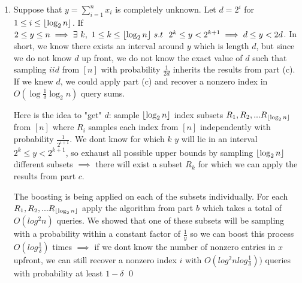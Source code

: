 \documentclass[12pt]{article}
\DeclarePairedDelimiter\floor{\lfloor}{\rfloor}
\begin{document}
\begin{solution}
\begin{enumerate}[label=(\alph*)]
\[
\implies \Pr{Q_i \neq 1} \leq 1 -\frac{1}{4d}
\]
The same analysis from the previous question now holds. We get a larger constant value on $d$ but it still requires $O(\log{\frac{1}{\delta}}\log_{2}{n})$ query sums to find a nonzero index with probability $\geq 1-\delta$. Qualitatively, if we can construct an estimate for $y$ within an interval $d \leq y \leq 2d$ we can find a non negative index in $x$ w.h.p \qed

\item Suppose that $y = \sum_{i=1}^n{x_i}$ is completely unknown. Let $d=2^i$ for $1 \leq i \leq \floor*{\log_{2}{n}}$. If $2 \leq y \leq n \implies \exists~k, ~1\leq k \leq \floor*{\log_{2}{n}} ~s.t~ ~ 2^k \leq y < 2^{k+1} \implies d \leq y < 2d$. In short, we know there exists an interval around $y$ which is length $d$, but since we do not know $d$ up front, we do not know the exact value of $d$ such that sampling $iid$ from $[n]$ with probability $\frac{1}{2d}$ inherits the results from part (c). If we knew $d$, we could apply part (c) and recover a nonzero index in $O(\log{\frac{1}{\delta}}\log_{2}{n})$ query sums.

Here is the idea to "get" $d$: sample  $\floor*{\log_{2}{n}}$ index subsets $R_1, R_2, ... R_{\floor*{\log_{2}{n}}}$ from $[n]$ where $R_i$ samples each index from $[n]$ independently with probability $\frac{1}{2^{i+1}}$. We dont know for which $k$ $y$ will lie in an interval $2^k \leq y < 2^{k+1}$, so exhaust all possible upper bounds by sampling $\floor*{\log_{2}{n}}$ different subsets $\implies $ there will exist a subset $R_k$ for which we can apply the results from part $c$. 

The boosting is being applied on each of the subsets individually. For each $R_1, R_2, ... R_{\floor*{\log_{2}{n}}}$ apply the algorithm from part $b$ which takes a total of $O(log^{2}{n})$ queries. We showed that one of these subsets will be sampling with a probability within a constant factor of $\frac{1}{y}$ so we can boost this process $O(log{\frac{1}{\delta}})$ times $\implies $ if we dont know the number of nonzero entries in $x$ upfront, we can still recover a nonzero index $i$ with $O(log^{2}{n}log{\frac{1}{\delta}}))$ queries with probability at least $1-\delta$ \qed






\end{enumerate}
\end{solution}
\end{document}
